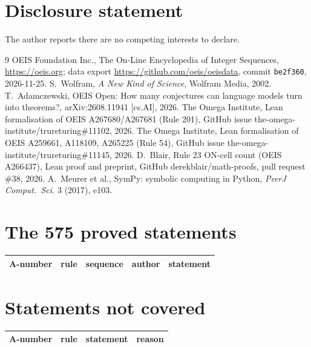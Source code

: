 \documentclass[11pt]{article}
\theoremstyle{definition}
\theoremstyle{remark}
\begin{document}
\section*{Disclosure statement}
The author reports there are no competing interests to declare.

\begin{thebibliography}{9}
 OEIS Foundation Inc., The On-Line Encyclopedia of Integer Sequences, \url{https://oeis.org}; data export \url{https://github.com/oeis/oeisdata}, commit \texttt{be2f360}, 2026-11-25.
 S.~Wolfram, \emph{A New Kind of Science}, Wolfram Media, 2002.
 T.~Adamczewski, OEIS Open: How many conjectures can language models turn into theorems?, arXiv:2608.11941 [cs.AI], 2026.
 The Omega Institute, Lean formalisation of OEIS A267680/A267681 (Rule 201), GitHub issue the-omega-institute/trureturing\#11102, 2026.
 The Omega Institute, Lean formalisation of OEIS A259661, A118109, A265225 (Rule 54), GitHub issue the-omega-institute/trureturing\#11145, 2026.
 D.~Blair, Rule 23 ON-cell count (OEIS A266437), Lean proof and preprint, GitHub derekblair/math-proofs, pull request \#38, 2026.
 A.~Meurer et al., SymPy: symbolic computing in Python, \emph{PeerJ Comput.\ Sci.} 3 (2017), e103.
\end{thebibliography}

\appendix
\section{The 575 proved statements}\label{app:proved}
{\small
\begin{longtable}{p{1.3cm}p{0.7cm}p{2.4cm}p{2.3cm}p{7.3cm}}
\toprule A-number & rule & sequence & author & statement\\\midrule\endhead
\bottomrule
\end{longtable}}

\section{Statements not covered}\label{app:other}
{\small
\begin{longtable}{p{1.3cm}p{0.7cm}p{10cm}p{3cm}}
\toprule A-number & rule & statement & reason\\\midrule\endhead
\bottomrule
\end{longtable}}
\end{document}
